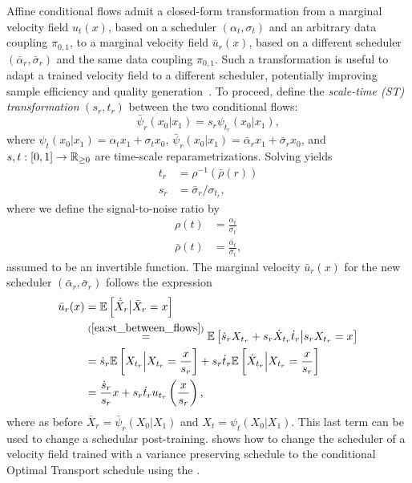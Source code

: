 \documentclass{fairmeta}
\renewcommand{\eqref}[1]{\labelcref{#1}}
\numberwithin{equation}{section}
\begin{document}
Affine conditional flows admit a closed-form transformation from a marginal velocity field $u_t(x)$, based on a scheduler $(\alpha_t,\sigma_t)$ and an arbitrary data coupling $\pi_{0,1}$, to a marginal velocity field $\bar{u}_r(x)$, based on a different scheduler $(\bar{\alpha}_r,\bar{\sigma}_r)$ and the same data coupling $\pi_{0,1}$.
Such a transformation is useful to adapt a trained velocity field to a different scheduler, potentially improving sample efficiency and quality generation~\citep{karras2022elucidating,shaul2023bespoke,pokle2023training}.
To proceed, define the \emph{scale-time (ST) transformation} $(s_r,t_r)$ between the two conditional flows:
\begin{equation}\label{ea:st_between_flows}
  \bar{\psi}_r(x_0|x_1) = s_r\psi_{t_r}(x_0|x_1),
\end{equation}
where $\psi_t(x_0|x_1)=\alpha_t x_1 + \sigma_t x_0$, $\bar{\psi}_r(x_0|x_1) = \bar{\alpha}_r x_1 + \bar{\sigma}_r x_0$, and $s,t:[0,1]\rightarrow \mathbb R_{\geq 0}$ are time-scale reparametrizations.
Solving \eqref{ea:st_between_flows} yields 
\begin{equation}\label{e:conversion}
    \begin{aligned}
    t_r &= \rho^{-1}(\bar{\rho}(r)) \\ s_r &= {\bar{\sigma}_r}/{\sigma_{t_r}},
    \end{aligned}
\end{equation}
where we define the signal-to-noise ratio by 
\begin{equation}\label{e:snr}
\begin{aligned}
    \rho(t)& =\frac{\alpha_t}{\sigma_t} \\
    \bar{\rho}(t)& =\frac{\bar{\alpha}_t}{\bar{\sigma}_t},    
\end{aligned}
\end{equation}
assumed to be an invertible function.
The marginal velocity $\bar{u}_r(x)$ for the new scheduler $(\bar{\alpha}_r,\bar{\sigma}_r)$ follows the expression
\begin{align*}\nonumber
    \bar{u}_r(x) &= \mathbb{E}\left [\dot{\bar{X}}_r \big| \bar{X}_r=x\right ] \\ \nonumber
    &\overset{(\ref{ea:st_between_flows})}{=} \mathbb{E}\left [ \dot{s}_rX_{t_r} + s_r\dot{X}_{t_r}\dot{t}_r \big\vert s_rX_{t_r} = x \right ] \\ \nonumber & = \dot{s}_r\mathbb{E}\left [X_{t_r} \Big \vert X_{t_r}=\frac{x}{s_r}\right ] + s_r\dot{t}_r \mathbb{E}\left [\dot{X}_{t_r}  \Big \vert X_{t_r}=\frac{x}{s_r}\right ] 
    \\  &= \frac{\dot{s}_r}{s_r}x + s_r \dot{t}_r u_{t_r}\left (\frac{x}{s_r}\right ),  
\end{align*}
where as before $\bar{X}_r=\bar{\psi}_r(X_0|X_1)$ and $X_t=\psi_t(X_0|X_1)$. This last term can be used to change a schedular post-training.  shows how to change the scheduler of a velocity field trained with a variance preserving schedule to the conditional Optimal Transport schedule using the \fmlibrary{}. 
\end{document}

